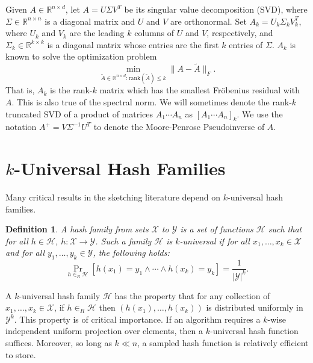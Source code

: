 \documentclass{report}
\newtheorem{definition}{Definition}[section]
\newcommand{\rank}{\mathrm{rank}}
\begin{document}
Given $A \in \mathbb{R}^{n\times d}$, let $A = U\Sigma V^T$ be its singular value decomposition (SVD), where $\Sigma \in \mathbb{R}^{n \times n}$ is a diagonal matrix and $U$ and $V$ are orthonormal.
Set $A_k = U_k \Sigma_k V^T_k$, where $U_k$ and $V_k$ are the leading $k$ columns of $U$ and $V$, respectively, and $\Sigma_k \in \mathbb{R}^{k \times k}$ is a diagonal matrix whose entries are the first $k$ entries of $\Sigma$. 
$A_k$ is known to solve the optimization problem
%
\begin{equation*}
\min\limits_{\widetilde{A} \in \mathbb{R}^{n \times d}: \rank(\widetilde{A}) \leq k} \|A-\widetilde{A}\|_F.
\end{equation*}
%
That is, $A_k$ is the rank-$k$ matrix which has the smallest Fr\"obenius residual with $A$.
This is also true of the spectral norm. 
We will sometimes denote the rank-$k$ truncated SVD of a product of matrices $A_1\cdots A_n$ as $[A_1\cdots A_n]_k$.
We use the notation $A^+ = V \Sigma^{-1} U^T$ to denote the Moore-Penrose Pseudoinverse of $A$. 


\section{$k$-Universal Hash Families} \label{sec:hashing}

Many critical results in the sketching literature depend on $k$-universal hash families. 
%
\begin{definition}
A hash family from sets $\mathcal{X}$ to $\mathcal{Y}$ is a set of functions $\mathcal{H}$ such that for all $h \in \mathcal{H}$, $h: \mathcal{X} \rightarrow \mathcal{Y}$.
Such a family $\mathcal{H}$ is $k$-universal if for all $x_1, \dots, x_k \in \mathcal{X}$ and for all $y_1, \dots, y_k \in \mathcal{Y}$, the following holds:
\begin{equation*}
\Pr_{h \in_R \mathcal{H}} \left [ h(x_1) = y_1 \wedge \cdots \wedge h(x_k) = y_k \right ] = \frac{1}{|\mathcal{Y}|^k}.
\end{equation*}
\end{definition}
%
A $k$-universal hash family $\mathcal{H}$ has the property that for any collection of $x_1, \dots, x_k \in \mathcal{X}$, if $h \in_R \mathcal{H}$ then $(h(x_1), \dots, h(x_k))$ is distributed uniformly in $\mathcal{Y}^k$. 
This property is of critical importance.
If an algorithm requires a $k$-wise independent uniform projection over elements, then a $k$-universal hash function suffices.
Moreover, so long as $k \ll n$, a sampled hash function is relatively efficient to store. 
\end{document}
